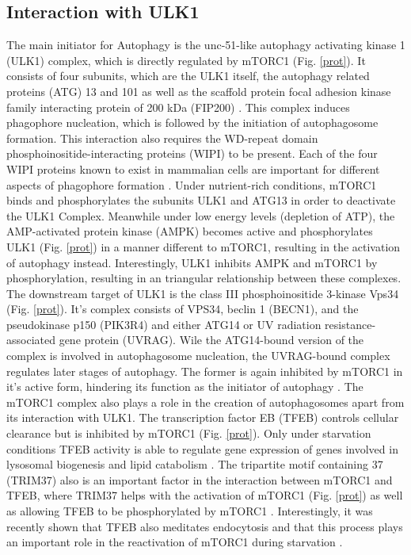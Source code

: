 \documentclass[12pt]{article} %
\begin{document}
\begin{linenumbers*}
\subsection{Interaction with ULK1}
The main initiator for Autophagy is the unc-51-like autophagy activating kinase 1 (ULK1) complex, which is directly regulated by mTORC1 (Fig. \ref{prot}). It consists of four subunits, which are the ULK1 itself, the autophagy related proteins (ATG) 13 and 101 as well as the scaffold protein focal adhesion kinase family interacting protein of 200 kDa (FIP200)  \citep{Mercer2018, Sciarretta2018}. 
This complex induces phagophore nucleation, which is followed by the initiation of autophagosome formation. This interaction also requires the WD-repeat domain phosphoinositide-interacting proteins (WIPI) to be present. Each of the four WIPI proteins known to exist in mammalian cells are important for different aspects of phagophore formation \citep{Dikic2018, Mercer2018}. 
Under nutrient-rich conditions, mTORC1 binds and phosphorylates the subunits ULK1 and ATG13 in order to deactivate the ULK1 Complex.  Meanwhile under low energy levels (depletion of ATP), the AMP-activated protein kinase (AMPK) becomes active and phosphorylates ULK1 (Fig. \ref{prot}) in a manner different to mTORC1, resulting in the activation of autophagy instead. Interestingly, ULK1 inhibits AMPK and mTORC1 by phosphorylation, resulting in an triangular relationship between these complexes. %
\citep{Mercer2018, Sciarretta2018, RabanalRuiz2018}
The downstream target of ULK1 is the class III phosphoinositide 3-kinase Vps34 (Fig. \ref{prot}). It's complex consists of VPS34, beclin 1 (BECN1), and the pseudokinase p150 (PIK3R4) and either ATG14 or UV radiation resistance-associated gene protein (UVRAG). Wile the ATG14-bound version of the complex is involved in autophagosome nucleation, the UVRAG-bound complex regulates later stages of autophagy. The former is again inhibited by mTORC1 in it's active form, hindering its function as the initiator of autophagy %
\citep{Mercer2018, RabanalRuiz2018}.
The mTORC1 complex also plays a role in the creation of autophagosomes apart from its interaction with ULK1. The transcription factor EB (TFEB) controls cellular clearance but is inhibited by mTORC1 (Fig. \ref{prot}). Only under starvation conditions TFEB activity is able to regulate gene expression of genes involved in lysosomal biogenesis and lipid catabolism \citep{Dikic2018}. The tripartite motif containing 37 (TRIM37) also is an important factor in the interaction between mTORC1 and TFEB, where TRIM37 helps with the activation of mTORC1 (Fig. \ref{prot}) as well as allowing TFEB to be phosphorylated by mTORC1 \citep{Wan2018}.
Interestingly, it was recently shown that TFEB also meditates endocytosis and that this process plays an important role in the reactivation of mTORC1 during starvation \citep{Nnah2019}.


\end{linenumbers*}
\end{document}
